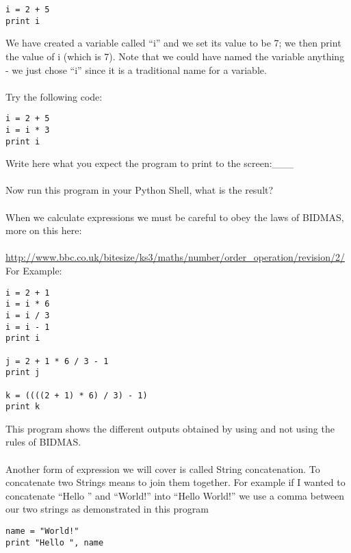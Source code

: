 \documentclass[twocolumn]{article}
\begin{document}
 \begin{lstlisting}
i = 2 + 5
print i
\end{lstlisting}
We have created a variable called ``i'' and we set its value to be 7; we then print the value of i (which is 7). Note that we could have named the variable anything - we just chose ``i'' since it is a traditional name for a variable.\\
\\
Try the following code:
\begin{lstlisting}
i = 2 + 5
i = i * 3
print i
\end{lstlisting}
Write here what you expect the program to print to the screen:\_\_\_\\
\\
Now run this program in your Python Shell, what is the result?\\
\\
When we calculate expressions we must be careful to obey the laws of BIDMAS, more on this here:\\
\\ \url{http://www.bbc.co.uk/bitesize/ks3/maths/number/order\_operation/revision/2/}\\
For Example:
\begin{lstlisting}
i = 2 + 1
i = i * 6
i = i / 3
i = i - 1
print i

j = 2 + 1 * 6 / 3 - 1
print j

k = ((((2 + 1) * 6) / 3) - 1)
print k
\end{lstlisting}
This program shows the different outputs obtained by using and not using the rules of BIDMAS.\\
\\
Another form of expression we will cover is called String concatenation. To concatenate two Strings means to join them together. For example if I wanted to concatenate ``Hello '' and ``World!'' into ``Hello World!'' we use a comma between our two strings as demonstrated in this program
\begin{lstlisting}
name = "World!"
print "Hello ", name
\end{lstlisting}
\end{document}
